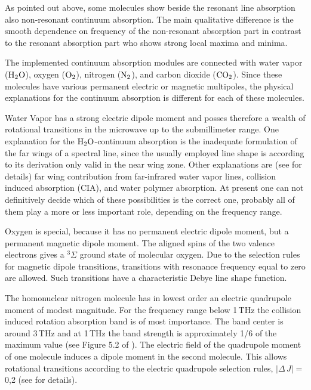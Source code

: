As pointed out above, some molecules show beside the resonant line
absorption also non-resonant continuum absorption. The main qualitative
difference is the smooth dependence on frequency of the non-resonant
absorption part in contrast to the resonant absorption part who shows 
strong local maxima and minima.

The implemented continuum absorption modules are connected with water
vapor ($\mbox{H}_2\mbox{O}$), oxygen ($\mbox{O}_2$), nitrogen ($\mbox{N}_2$), and carbon dioxide
($\mbox{CO}_2$). Since these molecules have various permanent electric or magnetic
multipoles, the physical explanations for the continuum absorption is 
different for each of these molecules.

Water Vapor has a strong electric dipole moment and posses therefore a 
wealth of rotational transitions in the microwave up to the submillimeter 
range. One explanation for the $\mbox{H}_2\mbox{O}$-continuum absorption is the inadequate 
formulation of the far wings of a spectral line, since the usually employed 
\citet{vanvleck:45} line shape is according to its derivation only valid 
in the near wing zone. Other explanations are (see \citet{pwr:93} for details) 
far wing contribution from far-infrared water vapor lines, collision induced 
absorption (CIA), and water polymer absorption. At present one can not definitively 
decide which of these possibilities is the correct one, probably all of them 
play a more or less important role, depending on the frequency range.

Oxygen is special, because it has no permanent electric dipole moment,
but a permanent magnetic dipole moment. The aligned spins of the two
valence electrons gives a $^{3}\Sigma$ ground state of molecular
oxygen.  Due to the selection rules for magnetic dipole transitions,
transitions with resonance frequency equal to zero are allowed. Such
transitions have a characteristic Debye line shape function.

The homonuclear nitrogen molecule has in lowest order an electric quadrupole moment 
of modest magnitude.
For the frequency range below 1\,THz the collision induced rotation absorption 
band \citep{goodyandyung:89} is of most importance. The band center is around 3\,THz and 
at 1\,THz the band strength is approximately 1/6 of the maximum value (see 
Figure 5.2 of \citet{goodyandyung:89}). The electric field of the quadrupole 
moment of one molecule induces a dipole moment in the second molecule. This allows 
rotational transitions according to the electric quadrupole selection rules, 
$|\Delta\,J|=$0,2 (see \citet{pwr:93} for details). 

